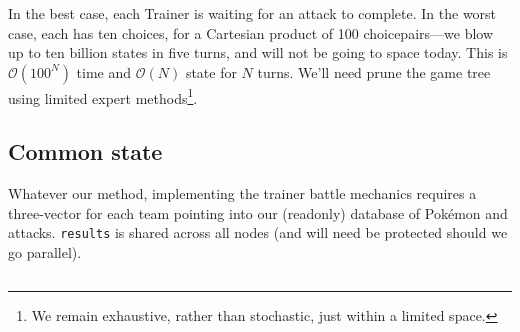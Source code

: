 In the best case, each Trainer is waiting for an attack to complete.
In the worst case, each has ten choices, for a Cartesian product of 100 choicepairs---we
  blow up to ten billion states in five turns, and will not be going to space today.
This is $\mathcal{O}(100^N)$ time and $\mathcal{O}(N)$ state for $N$ turns.
We'll need prune the game tree using limited expert methods\footnote{We remain exhaustive, rather than
 stochastic, just within a limited space.}.

\subsection{Common state\label{subsec:commonstate}}
Whatever our method, implementing the trainer battle mechanics requires a
  three-vector for each team pointing into our (readonly) database of Pokémon and attacks.
\texttt{results} is shared across all nodes (and will need be protected should we go parallel).
\inputminted{cpp}{book-simul-code/simul.h}

